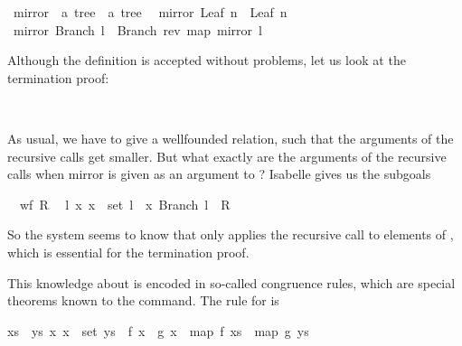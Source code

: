 \begin{isabellebody}
\isamarkuptrue%
\isamarkupfalse%
\ mirror\ {\isacharcolon}{\isacharcolon}\ {\isachardoublequoteopen}{\isacharprime}a\ tree\ {\isasymRightarrow}\ {\isacharprime}a\ tree{\isachardoublequoteclose}\isanewline
{}\isanewline
\ \ {\isachardoublequoteopen}mirror\ {\isacharparenleft}Leaf\ n{\isacharparenright}\ {\isacharequal}\ Leaf\ n{\isachardoublequoteclose}\isanewline
{\isacharbar}\ {\isachardoublequoteopen}mirror\ {\isacharparenleft}Branch\ l{\isacharparenright}\ {\isacharequal}\ Branch\ {\isacharparenleft}rev\ {\isacharparenleft}map\ mirror\ l{\isacharparenright}{\isacharparenright}{\isachardoublequoteclose}%
\begin{isamarkuptext}%
Although the definition is accepted without problems, let us look at the termination proof:%
\end{isamarkuptext}%
\isamarkuptrue%
\isamarkupfalse%
%
\isadelimproof
\ %
\endisadelimproof
%
\isatagproof
{}\isamarkupfalse%
%
\begin{isamarkuptxt}%
As usual, we have to give a wellfounded relation, such that the
  arguments of the recursive calls get smaller. But what exactly are
  the arguments of the recursive calls when mirror is given as an
  argument to ? Isabelle gives us the
  subgoals

  \begin{isabelle}%
\ {}{\isachardot}\ wf\ {\isacharquery}R\isanewline
\ {}{\isachardot}\ {\isasymAnd}l\ x{\isachardot}\ x\ {\isasymin}\ set\ l\ {\isasymLongrightarrow}\ {\isacharparenleft}x{\isacharcomma}\ Branch\ l{\isacharparenright}\ {\isasymin}\ {\isacharquery}R%
\end{isabelle} 

  So the system seems to know that  only
  applies the recursive call  to elements
  of , which is essential for the termination proof.

  This knowledge about  is encoded in so-called congruence rules,
  which are special theorems known to the  command. The
  rule for  is

  \begin{isabelle}%
{\isasymlbrakk}{\isacharquery}xs\ {\isacharequal}\ {\isacharquery}ys{\isacharsemicolon}\ {\isasymAnd}x{\isachardot}\ x\ {\isasymin}\ set\ {\isacharquery}ys\ {\isasymLongrightarrow}\ {\isacharquery}f\ x\ {\isacharequal}\ {\isacharquery}g\ x{\isasymrbrakk}\ {\isasymLongrightarrow}\ map\ {\isacharquery}f\ {\isacharquery}xs\ {\isacharequal}\ map\ {\isacharquery}g\ {\isacharquery}ys%
\end{isabelle}


\end{isamarkuptxt}
\end{isabellebody}
